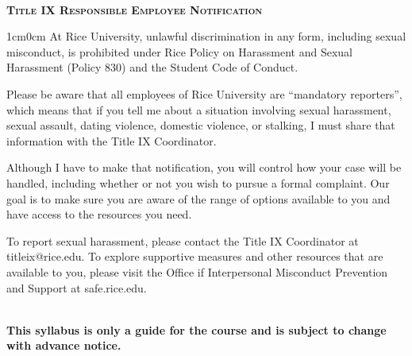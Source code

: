 ~\\
\textbf{\textsc{Title IX Responsible Employee Notification}}
\begin{adjustwidth}{1cm}{0cm}
  At Rice University, unlawful discrimination in any form, including sexual misconduct, is prohibited under Rice Policy on Harassment and Sexual Harassment (Policy 830) and the Student Code of Conduct.

  Please be aware that all employees of Rice University are ``mandatory reporters'', which means that if you tell me about a situation involving sexual harassment, sexual assault, dating violence, domestic violence, or stalking, I must share that information with the Title IX Coordinator.

  Although I have to make that notification, you will control how your case will be handled, including whether or not you wish to pursue a formal complaint. Our goal is to make sure you are aware of the range of options available to you and have access to the resources you need.

  To report sexual harassment, please contact the Title IX Coordinator at titleix@rice.edu. To explore supportive measures and other resources that are available to you, please visit the Office if Interpersonal Misconduct Prevention and Support at safe.rice.edu.
\end{adjustwidth}

~\\
\textbf{This syllabus is only a guide for the course and is subject to change with advance notice.}